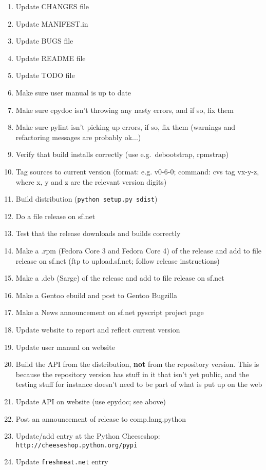 \documentclass[12pt,a4paper]{article}
\begin{document}
\begin{enumerate}
\item Update CHANGES file
\item Update MANIFEST.in
\item Update BUGS file
\item Update README file
\item Update TODO file
\item Make sure user manual is up to date
\item Make sure epydoc isn't throwing any nasty errors, and if so, fix them
\item Make sure pylint isn't picking up errors, if so, fix them (warnings
and refactoring messages are probably ok...)
\item Verify that build installs correctly (use e.g.~debootstrap, rpmstrap)
\item Tag sources to current version (format: e.g. v0-6-0; command: cvs tag
vx-y-z, where x, y and z are the relevant version digits)
\item Build distribution (\texttt{python setup.py sdist})
\item Do a file release on sf.net
\item Test that the release downloads and builds correctly
\item Make a .rpm (Fedora Core 3 and Fedora Core 4) of the release and 
add to file release on sf.net (ftp to upload.sf.net; follow release
instructions)
\item Make a .deb (Sarge) of the release and add to file release on sf.net
\item Make a Gentoo ebuild and post to Gentoo Bugzilla
\item Make a News announcement on sf.net pyscript project page
\item Update website to report and reflect current version
\item Update user manual on website
\item Build the API from the distribution, \textbf{not} from the repository 
version.  This is because the repository version has stuff in it that isn't
yet public, and the testing stuff for instance doesn't need to be part of
what is put up on the web
\item Update API on website (use epydoc; see above)
\item Post an announcement of release to comp.lang.python
\item Update/add entry at the Python Cheeseshop:
\texttt{http://cheeseshop.python.org/pypi}
\item Update \texttt{freshmeat.net} entry
\end{enumerate}
\end{document}
